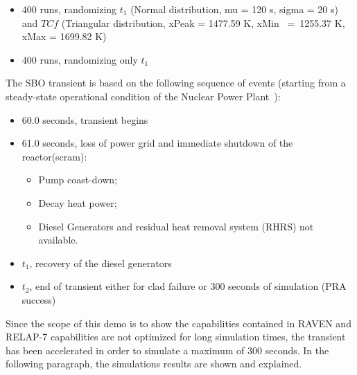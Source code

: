 \documentclass{mc2013}
\begin{document}
 \begin{itemize}
   \item 400 runs, randomizing $t_{1}$ (Normal distribution, mu = 120 s, sigma = 20 s) and $TC{f}$ (Triangular distribution, xPeak = 1477.59 K, xMin~ =~1255.37 K, xMax = 1699.82 K)
   \item 400 runs, randomizing only $t_{1}$
\end{itemize}
The SBO transient is based on the following sequence of events (starting from a steady-state operational condition of the Nuclear Power Plant~\cite{relap7FY12}):
 \begin{itemize}
   \item 60.0 seconds, transient begins
   \item 61.0 seconds, loss of power grid and immediate shutdown of the reactor(scram):
   \begin{itemize}
       \item Pump coast-down;  
       \item Decay heat power;
       \item Diesel Generators and residual heat removal system (RHRS) not available. 
    \end{itemize}
   \item $t_{1}$, recovery of the diesel generators
   \item $t_{2}$, end of transient either for clad failure or 300 seconds of simulation (PRA success)
\end{itemize}
Since the scope of this demo is to show the capabilities contained in RAVEN and RELAP-7 capabilities are not optimized for long simulation times, the transient has been accelerated in order to simulate a maximum of 300 seconds. 
In the following paragraph, the simulations results are shown and explained.
\end{document}

